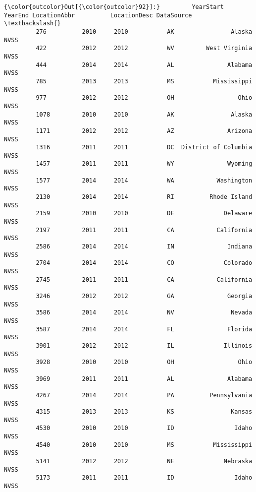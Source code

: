 \documentclass[11pt]{article}
\begin{document}
\begin{Verbatim}[commandchars=\\\{\}]
{\color{outcolor}Out[{\color{outcolor}92}]:}         YearStart  YearEnd LocationAbbr          LocationDesc DataSource  \textbackslash{}
         276          2010     2010           AK                Alaska       NVSS   
         422          2012     2012           WV         West Virginia       NVSS   
         444          2014     2014           AL               Alabama       NVSS   
         785          2013     2013           MS           Mississippi       NVSS   
         977          2012     2012           OH                  Ohio       NVSS   
         1078         2010     2010           AK                Alaska       NVSS   
         1171         2012     2012           AZ               Arizona       NVSS   
         1316         2011     2011           DC  District of Columbia       NVSS   
         1457         2011     2011           WY               Wyoming       NVSS   
         1577         2014     2014           WA            Washington       NVSS   
         2130         2014     2014           RI          Rhode Island       NVSS   
         2159         2010     2010           DE              Delaware       NVSS   
         2197         2011     2011           CA            California       NVSS   
         2586         2014     2014           IN               Indiana       NVSS   
         2704         2014     2014           CO              Colorado       NVSS   
         2745         2011     2011           CA            California       NVSS   
         3246         2012     2012           GA               Georgia       NVSS   
         3586         2014     2014           NV                Nevada       NVSS   
         3587         2014     2014           FL               Florida       NVSS   
         3901         2012     2012           IL              Illinois       NVSS   
         3928         2010     2010           OH                  Ohio       NVSS   
         3969         2011     2011           AL               Alabama       NVSS   
         4267         2014     2014           PA          Pennsylvania       NVSS   
         4315         2013     2013           KS                Kansas       NVSS   
         4530         2010     2010           ID                 Idaho       NVSS   
         4540         2010     2010           MS           Mississippi       NVSS   
         5141         2012     2012           NE              Nebraska       NVSS   
         5173         2011     2011           ID                 Idaho       NVSS   

\end{Verbatim}
\end{document}
